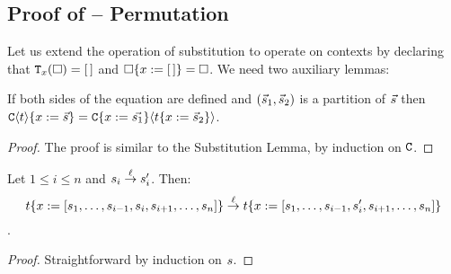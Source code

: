 
\subsection{Proof of  -- Permutation}
\label{appendix_strong_permutation}

Let us extend the operation of substitution to operate on contexts
by declaring that $\mathtt{T}_{x}(\Box) = [\,]$
and $\Box\{x := [\,]\} = \Box$.
We need two auxiliary lemmas:

\begin{lemma}
If both sides of the equation are defined
and $(\vec{s}_1,\vec{s}_2)$ is a partition of $\vec{s}$
then
$\mathtt{C}\langle t\rangle\{x := \vec{s}\} = \mathtt{C}\{x := \vec{s_1}\}\langle t\{x := \vec{s}_2\}\rangle$.
\end{lemma}
\begin{proof}
The proof is similar to the Substitution Lemma, by induction on $\mathtt{C}$.
\end{proof}

\begin{lemma}
Let $1 \leq i \leq n$ and $s_i \overset{\ell}{\to} s'_i$.
Then:
\[
 t\{x := [s_1,\hdots,s_{i-1},s_i,s_{i+1},\hdots,s_n]\} \overset{\ell}{\to}
 t\{x := [s_1,\hdots,s_{i-1},s'_i,s_{i+1},\hdots,s_n]\}
\].
\end{lemma}
\begin{proof}
Straightforward by induction on $s$.
\end{proof}

